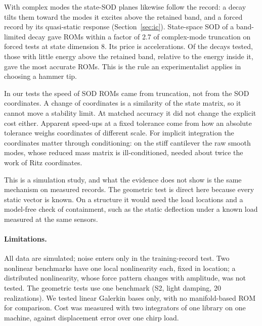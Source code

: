 \documentclass[preprint,12pt]{elsarticle}
\begin{document}
With complex modes the state-SOD planes likewise follow the record: a decay tilts them toward the modes it excites above the retained band, and a forced record by its quasi-static response (Section~\ref{sec:ic}). State-space SOD of a band-limited decay gave ROMs within a factor of 2.7 of complex-mode truncation on forced tests at state dimension 8. Its price is accelerations. Of the decays tested, those with little energy above the retained band, relative to the energy inside it, gave the most accurate ROMs. This is the rule an experimentalist applies in choosing a hammer tip.

In our tests the speed of SOD ROMs came from truncation, not from the SOD coordinates. A change of coordinates is a similarity of the state matrix, so it cannot move a stability limit. At matched accuracy it did not change the explicit cost either. Apparent speed-ups at a fixed tolerance come from how an absolute tolerance weighs coordinates of different scale. For implicit integration the coordinates matter through conditioning: on the stiff cantilever the raw smooth modes, whose reduced mass matrix is ill-conditioned, needed about twice the work of Ritz coordinates.

This is a simulation study, and what the evidence does not show is the same mechanism on measured records. The geometric test is direct here because every static vector is known. On a structure it would need the load locations and a model-free check of containment, such as the static deflection under a known load measured at the same sensors.

\paragraph{Limitations.} All data are simulated; noise enters only in the training-record test. Two nonlinear benchmarks have one local nonlinearity each, fixed in location; a distributed nonlinearity, whose force pattern changes with amplitude, was not tested. The geometric tests use one benchmark (S2, light damping, 20 realizations). We tested linear Galerkin bases only, with no manifold-based ROM \citep{Haller2016,Jain2017} for comparison. Cost was measured with two integrators of one library on one machine, against displacement error over one chirp load.
\end{document}
